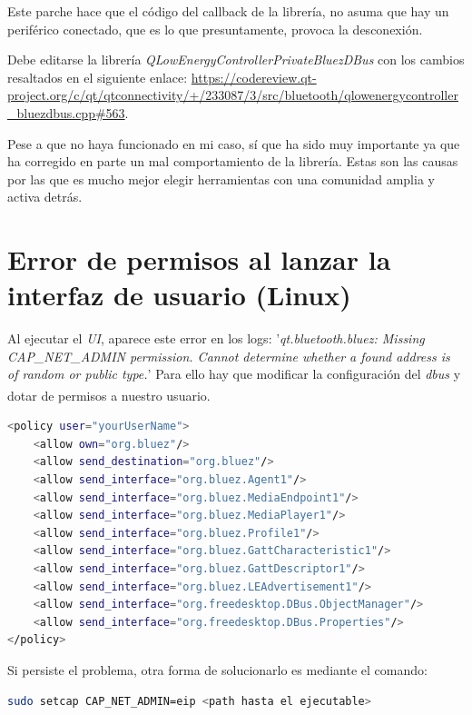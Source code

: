 \begin{appendices}
Este parche hace que el código del callback de la librería, no asuma que
hay un periférico conectado, que es lo que presuntamente, provoca
la desconexión.

Debe editarse la librería \textit{QLowEnergyControllerPrivateBluezDBus}
con los cambios resaltados en el siguiente enlace:
\url{https://codereview.qt-project.org/c/qt/qtconnectivity/+/233087/3/src/bluetooth/qlowenergycontroller_bluezdbus.cpp#563}.

Pese a que no haya funcionado en mi caso, sí que ha sido muy importante
ya que ha corregido en parte un mal comportamiento de la librería.
Estas son las causas por las que es mucho mejor elegir herramientas
con una comunidad amplia y activa detrás.


\section{Error de permisos al lanzar la interfaz de usuario (Linux)\label{permBTQT}}
Al ejecutar el \textit{UI}, aparece este error en los logs:
'\textit{qt.bluetooth.bluez: Missing CAP\_NET\_ADMIN permission. Cannot determine whether a found address is of random or public type.}'
Para ello hay que modificar la configuración del \textit{dbus} y dotar de permisos
a nuestro usuario.\textsuperscript{\cite{permBTQT}}
\newpage
\begin{lstlisting}[language=bash]
<policy user="yourUserName">
    <allow own="org.bluez"/>
    <allow send_destination="org.bluez"/>
    <allow send_interface="org.bluez.Agent1"/>
    <allow send_interface="org.bluez.MediaEndpoint1"/>
    <allow send_interface="org.bluez.MediaPlayer1"/>
    <allow send_interface="org.bluez.Profile1"/>
    <allow send_interface="org.bluez.GattCharacteristic1"/>
    <allow send_interface="org.bluez.GattDescriptor1"/>
    <allow send_interface="org.bluez.LEAdvertisement1"/>
    <allow send_interface="org.freedesktop.DBus.ObjectManager"/>
    <allow send_interface="org.freedesktop.DBus.Properties"/>
</policy>
\end{lstlisting}

Si persiste el problema, otra forma de solucionarlo es mediante el comando:
\begin{lstlisting}[language=bash]
    sudo setcap CAP_NET_ADMIN=eip <path hasta el ejecutable>
\end{lstlisting}


\end{appendices}
